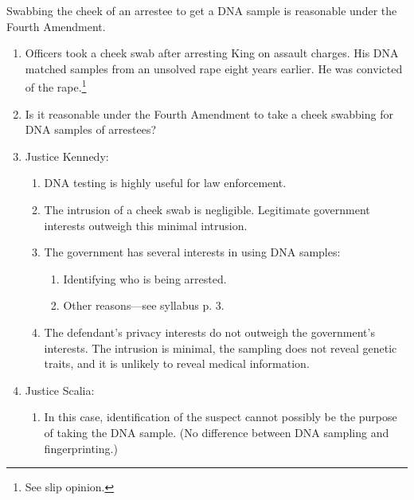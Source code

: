 Swabbing the cheek of an arrestee to get a DNA sample is reasonable under the 
Fourth Amendment.

\begin{enumerate}
    \item Officers took a cheek swab after arresting King on assault charges.  
    His DNA matched samples from an unsolved rape eight years earlier. He was 
    convicted of the rape.\footnote{See slip opinion.}
    \item Is it reasonable under the Fourth Amendment to take a cheek swabbing 
    for DNA samples of arrestees?
    \item Justice Kennedy:
    \begin{enumerate}
        \item DNA testing is highly useful for law enforcement.
        \item The intrusion of a cheek swab is negligible. Legitimate government 
        interests outweigh this minimal intrusion.
        \item The government has several interests in using DNA samples:
        \begin{enumerate}
            \item Identifying who is being arrested.
            \item Other reasons---see syllabus p. 3.
        \end{enumerate}
        \item The defendant's privacy interests do not outweigh the government's 
        interests. The intrusion is minimal, the sampling does not reveal 
        genetic traits, and it is unlikely to reveal medical information.
    \end{enumerate}
    \item Justice Scalia:
    \begin{enumerate}
        \item In this case, identification of the suspect cannot possibly be the 
        purpose of taking the DNA sample. (No difference between DNA sampling 
        and fingerprinting.)
    \end{enumerate}
\end{enumerate}
